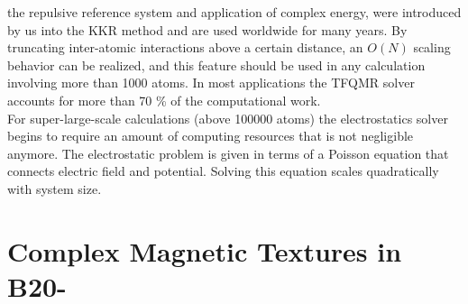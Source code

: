 \documentclass [a4paper, 12pt]{article}
\begin{document}
the repulsive reference system and application of complex energy, were
introduced by us into the KKR method \cite{zeller_application_1982,zeller_theory_1995}
and are used worldwide for many years. 
By truncating inter-atomic interactions above a certain distance, an $O(N)$ scaling 
behavior can be realized, and this feature should be used in any calculation involving more than 1000 atoms.
In most applications the TFQMR solver accounts for more than 70 \% of the computational work.
\\
For super-large-scale calculations (above 100000 atoms) the electrostatics solver begins
to require an amount of computing resources that is not negligible anymore. 
The electrostatic problem is given in terms of a Poisson equation that connects electric field and potential. 
Solving this equation scales quadratically with system size. 

\section{Complex Magnetic Textures in B20-}
\end{document}
